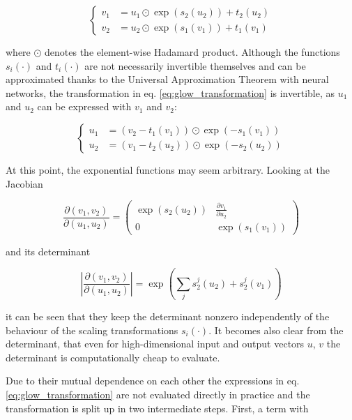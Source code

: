 \begin{equation}
	\left\{\begin{aligned}
		v_1 &= u_1 \odot \exp(s_2(u_2)) + t_2(u_2) \\
		v_2 &= u_2 \odot \exp(s_1(v_1)) + t_1(v_1)
	\end{aligned}\right.
	\label{eq:glow_transformation}
\end{equation}

where $\odot$ denotes the element-wise Hadamard product. Although the functions $s_i(\cdot)$ and $t_i(\cdot)$ are not necessarily invertible themselves and can be approximated thanks to the Universal Approximation Theorem with neural networks, the transformation in eq. \ref{eq:glow_transformation} is invertible, as $u_1$ and $u_2$ can be expressed with $v_1$ and $v_2$:

\begin{equation*}
	\left\{\begin{aligned}
		u_1 &= (v_2 - t_1(v_1)) \odot \exp(-s_1(v_1)) \\
		u_2 &= (v_1 - t_2(u_2)) \odot \exp(-s_2(u_2)) 
	\end{aligned}\right.
\end{equation*}

At this point, the exponential functions may seem arbitrary. Looking at the Jacobian

\begin{equation*}
	\frac{\partial (v_1, v_2)}{\partial(u_1, u_2)} = \left(\begin{matrix}
		\exp(s_2(u_2)) & \frac{\partial v_1}{\partial u_2} \\
		0             & \exp(s_1(v_1))
	\end{matrix}\right)
\end{equation*}

and its determinant

\begin{equation*}
	\left|\frac{\partial (v_1, v_2)}{\partial (u_1, u_2)} \right| = \exp \left(\sum_j s^j_2(u_2) + s^j_2(v_1) \right)
\end{equation*}

it can be seen that they keep the determinant nonzero independently of the behaviour of the scaling transformations $s_i(\cdot)$. It becomes also clear from the determinant, that even for high-dimensional input and output vectors $u$, $v$ the determinant is computationally cheap to evaluate.

Due to their mutual dependence on each other the expressions in eq. \ref{eq:glow_transformation} are not evaluated directly in practice and the transformation is split up in two intermediate steps. First, a term with

